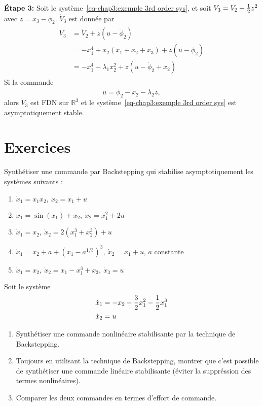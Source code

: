 \begin{example}
   \textbf{Étape 3:} Soit le système~\eqref{eq-chap3:exemple 3rd order sys}, et soit $V_3=V_2 + \frac{1}{2} z^2$ avec $z = x_3-\phi_2$. $\dot{V}_3$ est donnée par 
   \begin{align}
	   	\begin{split}
	   		\dot{V}_3 &= \dot{V}_2 + z\left(u-\dot{\phi}_2\right)\\
	   		&= -x_1^4 + x_2\left(x_1 +x_2 + x_3\right)+ z\left(u-\dot{\phi}_2\right) \\ 
	   		&= -x_1^4 -\lambda_1x_2^2 + z\left(u-\dot{\phi}_2+x_2\right)  
	   	\end{split}
   \end{align}
   Si la commande 
   \begin{equation}
   	u = \dot{\phi}_2-x_2-\lambda_2z,
   \end{equation} 
   alors $\dot{V}_3$ est FDN sur $\mathbb{R}^3$ et le système~\eqref{eq-chap3:exemple 3rd order sys} est asymptotiquement stable.
\end{example}

\newpage
\section{Exercices}
\begin{exercise}
	Synthétiser une commande par Backstepping qui stabilise asymptotiquement les systèmes suivants : 
	\begin{enumerate}
		\item $\dot{x}_1 = x_1x_2, \ \dot{x}_2 = x_1 +u$
		\item $\dot{x}_1 = \sin(x_1)+x_2, \ \dot{x}_2 = x_1^2 +2u$
		\item $\dot{x}_1 = x_2, \ \dot{x}_2 = 2(x_1^3+x_2^3) +u$
		\item $\dot{x}_1 = x_2 + a + (x_1-a^{1/3})^3, \ \dot{x}_2 = x_1 +u$, $a$ constante
		\item $\dot{x}_1 = x_2, \ \dot{x}_2 = x_1 - x_1^3 +x_3, \ \dot{x}_3=u$
	\end{enumerate}
\end{exercise}
\begin{exercise}
	Soit le système 
	\begin{align}
	\begin{split}
		\dot{x}_1 &= -x_2-\frac{3}{2}x_1^2-\frac{1}{2} x_1^3\\
		\dot{x}_2 &=u
	\end{split}
	\end{align}
	\begin{enumerate}
		\item Synthétiser une commande nonlinéaire stabilisante par la technique de Backstepping.
		\item Toujours en utilisant la technique de Backstepping, montrer que c'est possible de synthétiser une commande linéaire stabilisante (éviter la suppréssion des termes nonlinéaires).
		\item Comparer les deux commandes en termes d'effort de commande.
	\end{enumerate}
\end{exercise}

